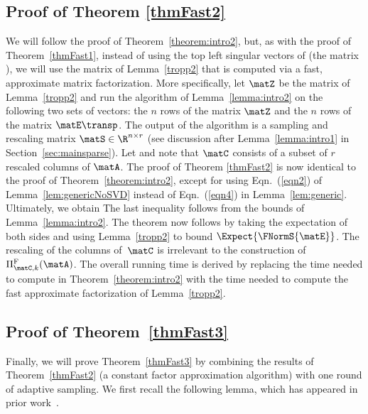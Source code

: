 \subsection{Proof of Theorem \ref{thmFast2}}
We will follow the proof of Theorem~\ref{theorem:intro2}, but, as with the proof of Theorem~\ref{thmFast1}, instead of using the top  left singular vectors of \math{\matA} (the matrix ), we will use the matrix \math{\matZ} of Lemma~\ref{tropp2} that is computed via a fast, approximate matrix factorization. More specifically, let $\matZ$ be the matrix of Lemma~\ref{tropp2} and run the algorithm of Lemma~\ref{lemma:intro2} on the following two sets of vectors: the $n$ rows of the matrix $\matZ$ and the $n$ rows of the matrix
$\matE\transp$.
The output of the algorithm is a sampling and rescaling matrix
$\matS \in {\R}^{n \times r}$ (see discussion after Lemma~\ref{lemma:intro1} in Section~\ref{sec:mainsparse}). Let \math{\matC=\matA \matS} and note that $\matC$ consists of a subset of $r$ rescaled
 columns of $\matA$. The proof of Theorem \ref{thmFast2} is now identical to the proof of Theorem~\ref{theorem:intro2}, except for using Eqn.~(\ref{eqn2}) of Lemma~\ref{lem:genericNoSVD} instead of Eqn.~(\ref{eqn4}) in Lemma~\ref{lem:generic}. Ultimately, we obtain
The last inequality follows from the bounds of Lemma~\ref{lemma:intro2}.
The theorem now follows by taking the expectation of both sides and
using Lemma~\ref{tropp2} to bound
$\Expect{ \FNormS{\matE} }$.
The rescaling of the columns of~$\matC$ is irrelevant to the construction of $\Pi_{\matC,k}^{\mathrm{F}}(\matA)$. The overall running time is derived by replacing the time needed to compute  in Theorem~\ref{theorem:intro2} with the time needed to compute the fast approximate
factorization of Lemma~\ref{tropp2}.

\subsection{Proof of Theorem~\ref{thmFast3}}
Finally, we will prove Theorem~\ref{thmFast3} by combining the results of Theorem~\ref{thmFast2} (a constant factor approximation algorithm) with one round of adaptive sampling. We first recall the following lemma, which has appeared in prior work~\cite{DFKVV99,FKV98}.


